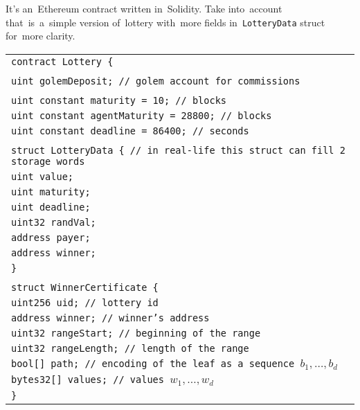 \documentclass[a4paper]{article}
\begin{document}
    It's an~Ethereum contract written in~Solidity. Take into~account that~is~a~simple version of~lottery with~more
    fields in~\texttt{LotteryData} struct for~more clarity.

    \begin{tabularx}{\linewidth}{l}
        \texttt{contract Lottery \{}\\
        \\
        \qquad\texttt{uint golemDeposit;  // golem account for~commissions}\\
        \\
        \qquad\texttt{uint constant maturity = 10; // blocks}\\
        \qquad\texttt{uint constant agentMaturity = 28800; // blocks}\\
        \qquad\texttt{uint constant deadline = 86400; // seconds}\\
        \\
        \qquad\texttt{struct LotteryData \{  // in~real-life this struct can fill 2 storage words}\\
        \qquad\qquad\texttt{uint value;}\\
        \qquad\qquad\texttt{uint maturity;}\\
        \qquad\qquad\texttt{uint deadline;}\\
        \qquad\qquad\texttt{uint32 randVal;}\\
        \qquad\qquad\texttt{address payer;}\\
        \qquad\qquad\texttt{address winner;}\\
        \qquad\texttt{\}}\\
        \\
        \qquad\texttt{struct WinnerCertificate \{}\\
        \qquad\qquad\texttt{uint256 uid;        // lottery id}\\
        \qquad\qquad\texttt{address winner;     // winner's address}\\
        \qquad\qquad\texttt{uint32 rangeStart;  // beginning of~the~range}\\
        \qquad\qquad\texttt{uint32 rangeLength; // length of~the~range}\\
        \qquad\qquad\texttt{bool[] path;        // encoding of~the~leaf as a~sequence $b_1, \ldots, b_d$}\\
        \qquad\qquad\texttt{bytes32[] values;   // values $w_1, \ldots, w_d$}\\
        \qquad\texttt{\}}\\

\end{tabularx}
\end{document}
